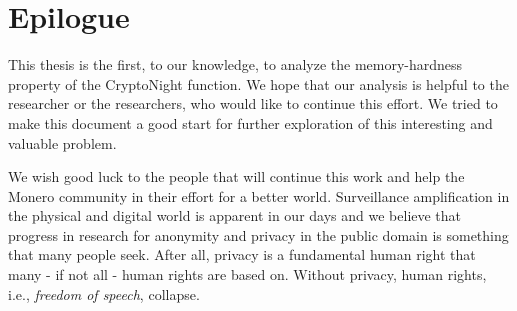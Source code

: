 \section{Epilogue}
This thesis is the first, to our knowledge, to analyze the memory-hardness property of the CryptoNight function. We hope that our analysis is helpful to the researcher or the researchers, who would like to continue this effort. We tried to make this document a good start for further exploration of this interesting and valuable problem.

We wish good luck to the people that will continue this work and help the Monero community in their effort for a better world. Surveillance amplification in the physical and digital world is apparent in our days and we believe that progress in research for anonymity and privacy in the public domain is something that many people seek. After all, privacy is a fundamental human right that many - if not all - human rights are based on. Without privacy, human rights, i.e., \emph{freedom of speech}, collapse.
